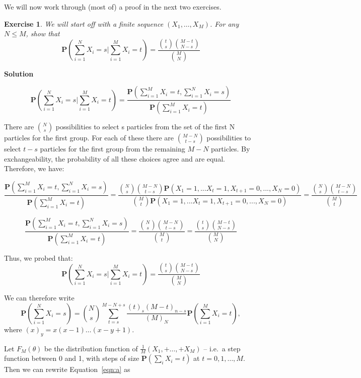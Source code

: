 \documentclass[twoside]{article}
\newcounter{lecnum}
\newtheorem{exercise}{Exercise}[lecnum]
\newcommand\Prob{\mathbf{P}}
\begin{document}
We will now work through (most of) a proof in the next two exercises.


\begin{exercise}
  We will start off with a finite sequence $(X_1,\dots, X_M)$. For any $N\leq M$, show that
  $$\Prob\left(\sum_{i=1}^N X_i = s\Big|\sum_{i=1}^M X_i = t\right) = \frac{{t\choose s}{M-t\choose N-s}}{{M \choose N}}$$
\end{exercise}

\color{blue}
\textbf{Solution}

$$\Prob\left(\sum_{i=1}^N X_i = s\Big|\sum_{i=1}^M X_i = t\right) =  \frac{ \Prob\left(\sum_{i=1}^M X_i = t, \sum_{i=1}^N X_i = s\right)}{  \Prob\left(\sum_{i=1}^M X_i = t\right)} $$

There are ${N\choose s}$ possibilities to select s particles from the set of the first N particles for the first group. For each of these there are ${M-N\choose t-s}$ possibilities to select $t-s$ particles for the first group from the remaining $M-N$ particles. By exchangeability, the probability of all these choices agree and are equal. Therefore, we have:

$$ \frac{ \Prob\left(\sum_{i=1}^M X_i = t, \sum_{i=1}^N X_i = s\right)}{  \Prob\left(\sum_{i=1}^M X_i = t\right)} = \frac{{N\choose s}{M-N\choose t-s} \Prob\left(X_1 = 1, ... X_t = 1, X_{t+1}=0, ..., X_N=0 \right)}{{M \choose t} \Prob\left(X_1 = 1, ... X_t = 1, X_{t+1}=0, ..., X_N=0\right)} = \frac{{N\choose s}{M-N\choose t-s}}{{M \choose t}} $$

$$\frac{ \Prob\left(\sum_{i=1}^M X_i = t, \sum_{i=1}^N X_i = s\right)}{  \Prob\left(\sum_{i=1}^M X_i = t\right)} = \frac{{N\choose s}{M-N\choose t-s}}{{M \choose t}} =  \frac{{t\choose s}{M-t\choose N-s}}{{M \choose N}} $$

Thus, we probed that:
  $$\Prob\left(\sum_{i=1}^N X_i = s\Big|\sum_{i=1}^M X_i = t\right) = \frac{{t\choose s}{M-t\choose N-s}}{{M \choose N}}$$


 \color{black}
 
We can therefore write
\begin{equation}\Prob\left(\sum_{i=1}^N X_i = s\right) = {N\choose s}\sum_{t=s}^{M-N+s}\frac{(t)_s(M-t)_{n-s}}{(M)_N}\Prob\left(\sum_{i=1}^M X_i = t\right),\label{eqn:a}\end{equation}
where $(x)_y = x(x-1)\dots (x-y+1)$.

Let $F_M(\theta)$ be the distribution function of $\frac{1}{M}(X_1, + \dots, + X_M)$  --  i.e.\ a step function between 0 and 1, with steps of size $\Prob(\sum_i X_i= t)$ at $t=0,1,\dots, M$. Then we can rewrite Equation~\ref{eqn:a} as
\end{document}

